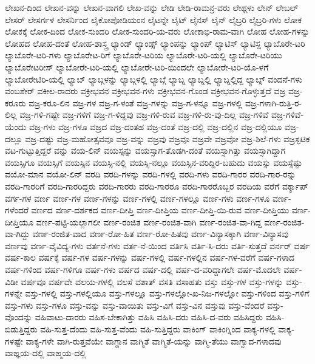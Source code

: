 {ಲೇಖನ-ದಿಂದ
ಲೇಖನ-ವನ್ನು
ಲೇಖನ-ವಾಗಲಿ
ಲೇಖ-ವನ್ನು
ಲೇಡಿ
ಲೇಡಿ-ರಾಮನ್ರ-ವರು
ಲೇಥ್ಗಳು
ಲೇನ್
ಲೇಬಲ್
ಲೇಸರ್
ಲೇಸರ್ಗಳ
ಲೇಸರ್ನಿಂದ
ಲೈಕೋಪೋಡಿಯಂನ
ಲೈಟನ್ನೇ
ಲೈಟ್
ಲೈನಸ್
ಲೈನ್
ಲೈಬ್ರರಿ
ಲೈಬ್ರರಿ-ಗಳು
ಲೋಕ
ಲೋಕಕ್ಕೆ
ಲೋಕ-ದಿಂದ
ಲೋಕ-ಸುಂದರಿ
ಲೋಕ-ಸುಂದರಿ-ಯ-ವರು
ಲೋಕಾಭಿ-ರಾಮ-ವಾಗಿ
ಲೋಹ
ಲೋಹ-ಗಳನ್ನು
ಲೋಹದ
ಲೋಹ-ದಂತೆ
ಲೋಹ-ಶಾಸ್ತ್ರ
ಲ್ಯಾಂಡ್
ಲ್ಯಾಂಡ್ಸ್
ಲ್ಯಾಂಪನ್ನು
ಲ್ಯಾಂಪ್
ಲ್ಯಾಟಿಸ್
ಲ್ಯಾಟಿಸ್ದ
ಲ್ಯಾಬೊರೇ-ಟರಿ
ಲ್ಯಾಬೊರೇ-ಟರಿ-ಗಳು
ಲ್ಯಾಬೊರೇಟ-ರಿಗೆ
ಲ್ಯಾಬೊರೇ-ಟರಿಯ
ಲ್ಯಾಬೊರೇ-ಟರಿ-ಯಲ್ಲಿ
ಲ್ಯಾಬೊರೇ-ಟರಿಯು
ಲ್ಯಾಬೊರೇಟರೀಸ್
ಲ್ಯಾಬೋರೇ-ಟರಿ-ಯಲ್ಲಿ
ಲ್ಯಾಬೋರೇ-ಟರಿ-ಯಿಂದಲೇ
ಲ್ಯಾಬೋರೇ-ಟರಿ-ಯೊ-ಳಗೆ
ಲ್ಯಾಬೋರೇಟಿರಿ-ಯಲ್ಲಿ
ಲ್ಯಾಬ್
ಲ್ಯಾಬ್ಗಳನ್ನು
ಲ್ಯಾಬ್ಗಳಲ್ಲಿ
ಲ್ಯಾಬ್ಗೆ
ಲ್ಯಾಬ್ನ
ಲ್ಯಾಬ್ನಲ್ಲಿ
ಲ್ಯಾಬ್ನಲ್ಲಿದ್ದ
ಲ್ಯಾಬ್ಸ್
ವಂದನೆ-ಗಳು
ವಂಬಶೇರ್
ವಕೀಲ-ರಾದರು
ವಕ್ರೀಭವನ
ವಕ್ರೀಭವನ-ಗಳು
ವಕ್ರೀಭವನ-ಗೊಂಡ
ವಕ್ರೀಭವನ-ಗೊಳ್ಳುತ್ತದೆ
ವಜ್ರ
ವಜ್ರ-ಕರೂರು
ವಜ್ರ-ಕರೂ-ಲಿನ
ವಜ್ರ-ಗಳ
ವಜ್ರ-ಗ-ಳಂತೆ
ವಜ್ರ-ಗಳನ್ನು
ವಜ್ರ-ಗ-ಳನ್ನೂ
ವಜ್ರ-ಗಳಲ್ಲಿ
ವಜ್ರ-ಗಳಾಗಿ-ರುತ್ತಿ-ರ-ಲಿಲ್ಲ
ವಜ್ರ-ಗಳಿ-ಗಷ್ಟೇ
ವಜ್ರ-ಗಳಿಗೆ
ವಜ್ರ-ಗ-ಳಿದ್ದವು
ವಜ್ರ-ಗಳಿ-ರುವ
ವಜ್ರ-ಗಳಿ-ರು-ವು-ದಿಲ್ಲ
ವಜ್ರ-ಗಳಿವೆ
ವಜ್ರ-ಗಳಿವೆ-ಯೆಂದು
ವಜ್ರ-ಗಳು
ವಜ್ರ-ಗಳೂ
ವಜ್ರದ
ವಜ್ರ-ದಂತಹ
ವಜ್ರ-ದಂತೆ
ವಜ್ರ-ದಲ್ಲಿ
ವಜ್ರ-ದಲ್ಲಿನ
ವಜ್ರ-ದಲ್ಲಿಯೂ
ವಜ್ರ-ದಲ್ಲೂ
ವಜ್ರ-ದಷ್ಟು
ವಜ್ರ-ಮಹೋತ್ಸವವೂ
ವಜ್ರ-ವನ್ನು
ವಜ್ರವು
ವಜ್ರವೂ
ವಜ್ರವೇ
ವಜ್ರವೋ
ವಜ್ರ-ಶಿಲೆ-ಗಳು
ವಜ್ರಸ್ಫಟಿಕ
ವಟ-ಗುಟ್ಟುತ್ತಿದ್ದರೆ
ವನ್ನು
ವಯ-ಲಿನ್
ವಯಸ್ಸನ್ನು
ವಯಸ್ಸಾಗ-ತೊಡಗಿ-ದಂತೆ
ವಯಸ್ಸಾಗಿತ್ತು
ವಯಸ್ಸಾಗಿದ್ದಾಗ
ವಯಸ್ಸಿಗೂ
ವಯಸ್ಸಿಗೆ
ವಯಸ್ಸಿನ
ವಯಸ್ಸಿ-ನಲ್ಲಿ
ವಯಸ್ಸಿ-ನಲ್ಲೂ
ವಯಸ್ಸಿನ-ವರಿದ್ದಿರ-ಬಹುದು
ವಯಸ್ಸು
ವಯಸ್ಸೆಷ್ಟು
ವಯೋ-ಮಾನ
ವಯೋ-ಲಿನ್
ವರದಿ
ವರದಿ-ಗಳನ್ನು
ವರದಿ-ಗಳಲ್ಲಿ
ವರದಿ-ಗಳು
ವರದಿ-ಗಾರರ
ವರದಿ-ಗಾರ-ರನ್ನು
ವರದಿ-ಗಾರರಿಗೆ
ವರದಿ-ಗಾರರಿದ್ದರು
ವರದಿ-ಗಾರರು
ವರದಿ-ಗಾರರೂ
ವರದಿ-ಗಾರರೊಬ್ಬರ
ವರದಿಯ
ವರೆಗೆ
ವರ್ಕ್ಶಾಪ್
ವರ್ಗ-ಗಳ
ವರ್ಣ
ವರ್ಣ-ಗಳ
ವರ್ಣ-ಗಳನ್ನು
ವರ್ಣ-ಗಳಲ್ಲಿ
ವರ್ಣ-ಗಳಲ್ಲೂ
ವರ್ಣ-ಗಳು
ವರ್ಣ-ಗಳೂ
ವರ್ಣ-ಗಳೆಂದರೆ
ವರ್ಣದ
ವರ್ಣ-ದರ್ಶಕದ
ವರ್ಣ-ದೀಪ್ತಿ
ವರ್ಣ-ದೀಪ್ತಿಯ
ವರ್ಣ-ದೀಪ್ತಿ-ಯಿ-ರುವ
ವರ್ಣ-ದೀಪ್ತಿಯು
ವರ್ಣ-ದೀಪ್ತಿಯೂ
ವರ್ಣ-ಪಟ್ಟಿ-ಯಲ್ಲಾಗಲೀ
ವರ್ಣ-ರಂಜಿತ
ವರ್ಣ-ರಂಜಿತ-ವಾಗಿ
ವರ್ಣ-ರಂಜಿತ-ವಾ-ಗಿದ್ದ
ವರ್ಣ-ರಂಜಿತ-ವಾ-ಗಿದ್ದು
ವರ್ಣ-ರಂಜಿತ-ವಾದ
ವರ್ಣ-ರೋ-ಹಿತ
ವರ್ಣ-ರೋ-ಹಿತವು
ವರ್ಣ-ವಿನ್ಯಾಸಕ್ಕಾಗಿ
ವರ್ಣ-ವಿನ್ಯಾಸವು
ವರ್ಣವು
ವರ್ಣ-ವೈವಿದ್ಯ-ಗಳು
ವರ್ತನೆ-ಗಳು
ವರ್ತ-ನೆ-ಯಿಂದ
ವರ್ತಿಸಿ
ವರ್ತಿ-ಸಿ-ದರು
ವರ್ತಿ-ಸುತ್ತದೆ
ವರ್ನರ್
ವರ್ಷ
ವರ್ಷ-ಕಾಲ
ವರ್ಷಕ್ಕೆ
ವರ್ಷ-ಗಳ
ವರ್ಷ-ಗಳನ್ನು
ವರ್ಷ-ಗಳಲ್ಲಿ
ವರ್ಷ-ಗಳಲ್ಲಿನ
ವರ್ಷ-ಗಳ-ವರೆಗೆ
ವರ್ಷ-ಗಳಾದ
ವರ್ಷ-ಗಳಿಂದ
ವರ್ಷ-ಗಳಿಗೂ
ವರ್ಷ-ಗಳು
ವರ್ಷದ
ವರ್ಷ-ದಲ್ಲಿ
ವರ್ಷ-ದ-ವರಿದ್ದಾಗಲೇ
ವರ್ಷ-ಮೊದಲೇ
ವರ್ಷ-ವಿಡೀ
ವರ್ಷವೂ
ವರ್ಷವೇ
ವಲಯ-ಗಳಲ್ಲಿ
ವಲಸೆ
ವಶಾತ್
ವಸತಿ
ವಸಾಹತು
ವಸ್ತು
ವಸ್ತು-ಗಳ
ವಸ್ತು-ಗಳನ್ನು
ವಸ್ತು-ಗಳನ್ನೇ
ವಸ್ತು-ಗಳಲ್ಲಿ
ವಸ್ತು-ಗಳಲ್ಲಿಯೂ
ವಸ್ತು-ಗಳಲ್ಲೂ
ವಸ್ತು-ಗಳಲ್ಲೋ-ಖ-ನಿಜ-ಗಳಲ್ಲೋ
ವಸ್ತು-ಗಳಿಂದ
ವಸ್ತು-ಗಳಿಗೆ
ವಸ್ತು-ಗಳು
ವಸ್ತು-ಗಳೂ
ವಸ್ತು-ವನ್ನು
ವಸ್ತು-ವಾಯಿತು
ವಸ್ತು-ವಿಗೆ
ವಸ್ತು-ವಿನ
ವಸ್ತುವು
ವಸ್ತು-ವೆಂದರೆ
ವಸ್ತು-ವೊಂದನ್ನು
ವಹಿವಾಟು-ದಾರರು
ವಹಿಸ-ಬೇಕಾಗಿತ್ತು
ವಹಿಸಿ
ವಹಿಸಿ-ದರು
ವಹಿಸಿ-ದ-ವರು
ವಹಿಸಿದ್ದರು
ವಹಿಸಿ-ಬಿಡುತ್ತಿದ್ದರು
ವಹಿ-ಸುತ್ತ-ದೆಂದು
ವಹಿ-ಸುತ್ತ-ವೆಂದು
ವಹಿ-ಸುತ್ತಿದ್ದರು
ವಾಕಿಂಗ್
ವಾಕಿಂಗ್ನಿಂದ
ವಾಕ್ಯ-ಗಳಲ್ಲಿ
ವಾಕ್ಯ-ಗಳಷ್ಟೇ
ವಾಕ್ಯ-ಗಳೇ
ವಾಗಿ-ರುತ್ತವೆಯೇ
ವಾಗ್ದಾನ
ವಾಗ್ಮಿತೆ
ವಾಗ್ಮಿತೆ-ಯನ್ನು
ವಾಗ್ಮಿ-ತೆಯು
ವಾಗ್ವಾದ-ಗಳಾದವು
ವಾಙ್ಞಯ-ದಲ್ಲಿ
ವಾಙ್ಮಯ-ದಲ್ಲಿ
}
